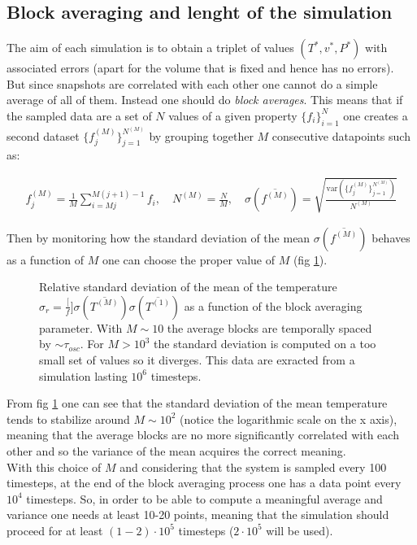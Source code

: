 \documentclass[a4paper, 11pt]{article}
\begin{document}
  \subsection{Block averaging and lenght of the simulation}
    The aim of each simulation is to obtain a triplet of values $(T^*,v^*,P^*)$ with associated errors (apart for the volume that is fixed and hence has no errors). But since snapshots are correlated with each other one cannot do a simple average of all of them. Instead one should do \emph{block averages}.
    This means that if the sampled data are a set of $N$ values of a given property $\{f_i\}_{i=1}^N$ one creates a second dataset $\{f_j^{(M)}\}_{j=1}^{N^{(M)}}$
    by grouping together $M$ consecutive datapoints such as:

    \begin{gather}
      f_j^{(M)} = \frac{1}{M} \sum_{i=Mj}^{M(j+1) - 1} f_i, \quad N^{(M)} = \frac{N}{M}, \quad
      \sigma({\overbar{f^{(M)}}}) = \sqrt{\frac{\text{var}(\{f_j^{(M)}\}_{j=1}^{N^{(M)}})}{N^{(M)}}}
    \end{gather}

    Then by monitoring how the standard deviation of the mean $\sigma({\overbar{f^{(M)}}})$ behaves as a function of $M$ one can choose the proper value of $M$ (fig \ref{fig:block1}).

    \begin{figure}[H]
      \centering
      \caption{Relative standard deviation of the mean of the temperature $\sigma_r = \frac[f]{\sigma({\overbar{T^{(M)}}})}{\sigma({\overbar{T^{(1)}}})}$ as a function of the block averaging parameter.
      With $M \sim 10$ the average blocks are temporally spaced by $\sim \tau_{osc}$. For $M > 10^3$ the standard deviation is computed on a too small set of values so it diverges. This data are exracted from a simulation lasting $10^6$ timesteps.}
      \label{fig:block1}
    \end{figure}

    From fig \ref{fig:block1} one can see that the standard deviation of the mean temperature tends to stabilize around $M \sim 10^2$ (notice the logarithmic scale on the x axis), meaning that the average blocks are no more significantly correlated with each other and so the variance of the mean acquires the correct meaning.\\
    With this choice of $M$ and considering that the system is sampled every 100 timesteps, at the end of the block averaging process one has a data point every $10^4$ timesteps. So, in order to be able to compute a meaningful average and variance one needs at least 10-20 points, meaning that the simulation should proceed for at least $(1-2)\cdot10^5$ timesteps ($2\cdot10^5$ will be used).
\end{document}
